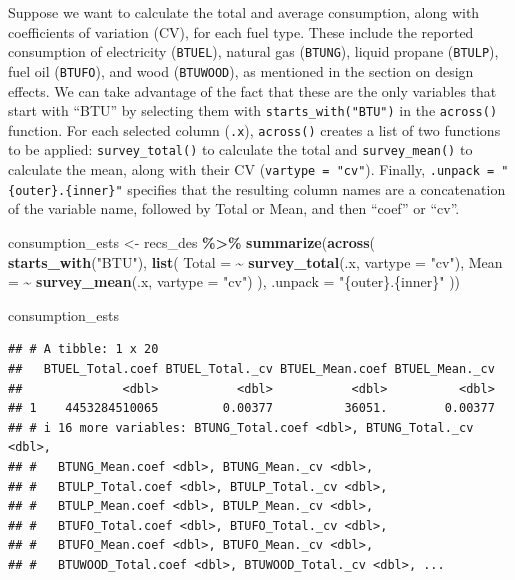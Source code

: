 \documentclass[
]{krantz}
\makeatletter
\newenvironment{Shaded}{\begin{snugshade}}{\end{snugshade}}
\newcommand{\AttributeTok}[1]{\textcolor[rgb]{0.27,0.27,0.27}{#1}}
\newcommand{\FunctionTok}[1]{\textcolor[rgb]{0.27,0.27,0.27}{\textbf{#1}}}
\newcommand{\NormalTok}[1]{#1}
\newcommand{\OtherTok}[1]{\textcolor[rgb]{0.37,0.37,0.37}{#1}}
\newcommand{\SpecialCharTok}[1]{\textcolor[rgb]{0.43,0.43,0.43}{\textbf{#1}}}
\newcommand{\StringTok}[1]{\textcolor[rgb]{0.5,0.5,0.5}{#1}}
\newenvironment{kframe}{%
\medskip{}
\setlength{\fboxsep}{.8em}
 \def\at@end@of@kframe{}%
 \ifinner\ifhmode%
  \def\at@end@of@kframe{\end{minipage}}%
  \begin{minipage}{\columnwidth}%
 \fi\fi%
 \def\FrameCommand##1{\hskip\@totalleftmargin \hskip-\fboxsep
 \colorbox{shadecolor}{##1}\hskip-\fboxsep
     \hskip-\linewidth \hskip-\@totalleftmargin \hskip\columnwidth}%
 \MakeFramed {\advance\hsize-\width
   \@totalleftmargin\z@ \linewidth\hsize
   \@setminipage}}%
 {\par\unskip\endMakeFramed%
 \at@end@of@kframe}
\renewenvironment{Shaded}{\begin{kframe}}{\end{kframe}}
\makeatother
\begin{document}
Suppose we want to calculate the total and average consumption, along with coefficients of variation (CV), for each fuel type. These include the reported consumption of electricity (\texttt{BTUEL}), natural gas (\texttt{BTUNG}), liquid propane (\texttt{BTULP}), fuel oil (\texttt{BTUFO}), and wood (\texttt{BTUWOOD}), as mentioned in the section on design effects. We can take advantage of the fact that these are the only variables that start with ``BTU'' by selecting them with \texttt{starts\_with("BTU")} in the \texttt{across()} function. For each selected column (\texttt{.x}), \texttt{across()} creates a list of two functions to be applied: \texttt{survey\_total()} to calculate the total and \texttt{survey\_mean()} to calculate the mean, along with their CV (\texttt{vartype\ =\ "cv"}). Finally, \texttt{.unpack\ =\ "\{outer\}.\{inner\}"} specifies that the resulting column names are a concatenation of the variable name, followed by Total or Mean, and then ``coef'' or ``cv''.

\begin{Shaded}
\begin{Highlighting}[]
\NormalTok{consumption\_ests }\OtherTok{\textless{}{-}}\NormalTok{ recs\_des }\SpecialCharTok{\%\textgreater{}\%}
  \FunctionTok{summarize}\NormalTok{(}\FunctionTok{across}\NormalTok{(}
    \FunctionTok{starts\_with}\NormalTok{(}\StringTok{"BTU"}\NormalTok{),}
    \FunctionTok{list}\NormalTok{(}
      \AttributeTok{Total =} \SpecialCharTok{\textasciitilde{}} \FunctionTok{survey\_total}\NormalTok{(.x, }\AttributeTok{vartype =} \StringTok{"cv"}\NormalTok{),}
      \AttributeTok{Mean =} \SpecialCharTok{\textasciitilde{}} \FunctionTok{survey\_mean}\NormalTok{(.x, }\AttributeTok{vartype =} \StringTok{"cv"}\NormalTok{)}
\NormalTok{    ),}
    \AttributeTok{.unpack =} \StringTok{"\{outer\}.\{inner\}"}
\NormalTok{  ))}

\NormalTok{consumption\_ests}
\end{Highlighting}
\end{Shaded}

\begin{verbatim}
## # A tibble: 1 x 20
##   BTUEL_Total.coef BTUEL_Total._cv BTUEL_Mean.coef BTUEL_Mean._cv
##              <dbl>           <dbl>           <dbl>          <dbl>
## 1    4453284510065         0.00377          36051.        0.00377
## # i 16 more variables: BTUNG_Total.coef <dbl>, BTUNG_Total._cv <dbl>,
## #   BTUNG_Mean.coef <dbl>, BTUNG_Mean._cv <dbl>,
## #   BTULP_Total.coef <dbl>, BTULP_Total._cv <dbl>,
## #   BTULP_Mean.coef <dbl>, BTULP_Mean._cv <dbl>,
## #   BTUFO_Total.coef <dbl>, BTUFO_Total._cv <dbl>,
## #   BTUFO_Mean.coef <dbl>, BTUFO_Mean._cv <dbl>,
## #   BTUWOOD_Total.coef <dbl>, BTUWOOD_Total._cv <dbl>, ...
\end{verbatim}
\end{document}
